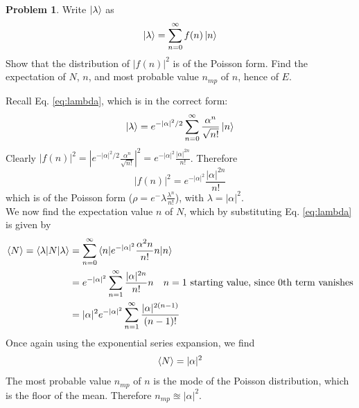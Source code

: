 \documentclass{article}
\theoremstyle{definition}
\newtheorem{definition}{Problem}[section]
\theoremstyle{remark}
\begin{document}
\begin{definition}
    Write $\ket{\lambda}$ as
    \begin{equation*}
        \ket{\lambda} = \sum_{n=0}^{\infty}f(n)\ket{n}
    \end{equation*}
    Show that the distribution of $|f(n)|^2$ is of the Poisson form. Find the expectation of $N$, $n$, and most probable value $n_{mp}$ of $n$, hence of $E$.
\end{definition}
Recall Eq. \ref{eq:lambda}, which is in the correct form:
\begin{equation*}
    \ket{\lambda} = e^{-|\alpha|^2/2}\sum_{n=0}^\infty\frac{\alpha^n}{\sqrt{n!}}\ket{n}
\end{equation*}
Clearly $|f(n)|^2 = |e^{-|\alpha|^2/2}\frac{\alpha^n}{\sqrt{n!}}|^2 = e^{-|\alpha|^2}\frac{|\alpha|^{2n}}{n!}$. Therefore
\begin{equation}
    \label{eq:poisson}
    |f(n)|^2 = e^{-|\alpha|^2}\frac{|\alpha|^{2n}}{n!}
\end{equation}
which is of the Poisson form ($\rho = e^-\lambda\frac{\lambda^n}{n!}$), with $\lambda = |\alpha|^2$.\\
\indent We now find the expectation value $n$ of $N$, which by substituting Eq. \ref{eq:lambda} is given by
\begin{align*}
    \braket{N} = \braket{\lambda|N|\lambda} &= \sum_{n=0}^{\infty}\braket{n|e^{-|\alpha|^2}\frac{\alpha^2n}{n!}n|n}\\
                                            &= e^{-|\alpha|^2}\sum_{n=1}^{\infty}\frac{|\alpha|^{2n}}{n!}n \quad n=1 \text{ starting value, since 0th term vanishes}\\
                                            &= |\alpha|^2e^{-|\alpha|^2}\sum_{n=1}^{\infty}\frac{|\alpha|^{2(n-1)}}{(n-1)!}
\end{align*}
Once again using the exponential series expansion, we find
\begin{equation}
    \label{eq:expectation of N}
    \braket{N} = |\alpha|^2
\end{equation}
The most probable value $n_{mp}$ of $n$ is the mode of the Poisson distribution, which is the floor of the mean. Therefore $n_{mp} \approxeq |\alpha|^2$.\\
\end{document}
